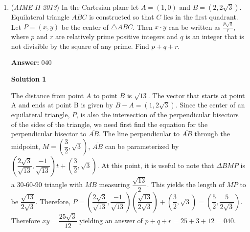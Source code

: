 \begin{enumerate}
 
 \textbf{Answer: }350



\textbf{Solution}

We find that $T=10(1+2+\cdots +119)$. From Gauss's formula, we find that the value of $T$ is $10(7140)=71400$. The value of $\frac{T}{2}$ is therefore $35700$. We find that $35700$ is $10(3570)=10\cdot \frac{k(k+1)}{2}$, so $3570=\frac{k(k+1)}{2}$. As a result, $7140=k(k+1)$, which leads to $0=k^2+k-7140$. We notice that $k=84$, so the answer is $10(119-84)=\boxed{350}$.

 


	\item (\textit{AIME II 2013}) In the Cartesian plane let $A = (1,0)$ and $B = \left( 2, 2\sqrt{3} \right)$.  Equilateral triangle $ABC$ is constructed so that $C$ lies in the first quadrant.  Let $P=(x,y)$ be the center of $\triangle ABC$.  Then $x \cdot y$ can be written as $\frac{p\sqrt{q}}{r}$, where $p$ and $r$ are relatively prime positive integers and $q$ is an integer that is not divisible by the square of any prime.  Find $p+q+r$.


 
 \textbf{Answer: }040



\textbf{Solution 1}

The distance from point $A$ to point $B$ is $\sqrt{13}$. The vector that starts at point A and ends at point B is given by $B - A = (1, 2\sqrt{3})$. Since the center of an equilateral triangle, $P$, is also the intersection of the perpendicular bisectors of the sides of the triangle, we need first find the equation for the perpendicular bisector to $\overline{AB}$. The line perpendicular to $\overline{AB}$ through the midpoint, $M =  \left(\dfrac{3}{2},\sqrt{3}\right)$, $\overline{AB}$ can be parameterized by $\left(\dfrac{2\sqrt{3}}{\sqrt{13}}, \dfrac{-1}{\sqrt{13}}\right) t + \left(\dfrac{3}{2},\sqrt{3}\right)$. At this point, it is useful to note that $\Delta BMP$ is a 30-60-90 triangle with $\overline{MB}$ measuring $\dfrac{\sqrt{13}}{2}$. This yields the length of $\overline{MP}$ to be $\dfrac{\sqrt{13}}{2\sqrt{3}}$. Therefore, $P =\left(\dfrac{2\sqrt{3}}{\sqrt{13}},\dfrac{-1}{\sqrt{13}}\right)\left(\dfrac{\sqrt{13}}{2\sqrt{3}}\right) + \left(\dfrac{3}{2},\sqrt{3}\right) = \left(\dfrac{5}{2}, \dfrac{5}{2\sqrt{3}}\right)$. Therefore $xy = \dfrac{25\sqrt{3}}{12}$ yielding an answer of $p + q + r  = 25 + 3 + 12 = \boxed{040}$.

 




\end{enumerate}
